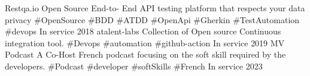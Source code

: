 
\begin{cvhonors}

  \cvhonor
    {Restqa.io} %
    {Open Source End-to- End API testing platform that respects your data privacy \#OpenSource \#BDD  \#ATDD \#OpenApi \#Gherkin \#TestAutomation \#devops}
    {In service} %
    {2018} %
  \cvhonor
    {atalent-labs} %
    {Collection of Open source Continuous integration tool. \#Devops \#automation #github-action}
    {In service} %
    {2019} %
  \cvhonor
    {MV Podcast} %
    {A Co-Host French podcast focusing on the soft skill required by the developers. \#Podcast \#developer \#softSkills \#French}
    {In service} %
    {2023} %
\end{cvhonors}
